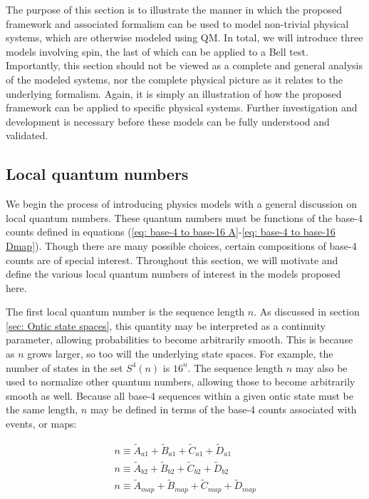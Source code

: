 \documentclass{article}
\begin{document}
The purpose of this section is to illustrate the manner in which the proposed framework and associated formalism can be used to model non-trivial physical systems, which are otherwise modeled using QM. In total, we will introduce three models involving spin, the last of which can be applied to a Bell test. Importantly, this section should not be viewed as a complete and general analysis of the modeled systems, nor the complete physical picture as it relates to the underlying formalism. Again, it is simply an illustration of how the proposed framework can be applied to specific physical systems. Further investigation and development is necessary before these models can be fully understood and validated.  

\subsection{Local quantum numbers \label{sec: Local quantum numbers}}

We begin the process of introducing physics models with a general discussion on local quantum numbers. These quantum numbers must be functions of the base-4 counts defined in equations (\ref{eq: base-4 to base-16 A}-\ref{eq: base-4 to base-16 Dmap}). Though there are many possible choices, certain compositions of base-4 counts are of special interest. Throughout this section, we will motivate and define the various local quantum numbers of interest in the models proposed here. 

The first local quantum number is the sequence length $n$. As discussed in section \ref{sec: Ontic state spaces}, this quantity may be interpreted as a continuity parameter, allowing probabilities to become arbitrarily smooth. This is because as $n$ grows larger, so too will the underlying state spaces. For example, the number of states in the set $S^4(n)$ is $16^n$. The sequence length $n$ may also be used to normalize other quantum numbers, allowing those to become arbitrarily smooth as well. Because all base-4 sequences within a given ontic state must be the same length, $n$ may be defined in terms of the base-4 counts associated with events, or maps:

\begin{equation}
\begin{array}{l}
    n \equiv \tilde{A}_{a1} + \tilde{B}_{a1} + \tilde{C}_{a1} + \tilde{D}_{a1}\\
    n \equiv \tilde{A}_{b2} + \tilde{B}_{b2} + \tilde{C}_{b2} + \tilde{D}_{b2} \\
    n \equiv \tilde{A}_{map} + \tilde{B}_{map} + \tilde{C}_{map} + \tilde{D}_{map}
\end{array}
\end{equation}
\end{document}
